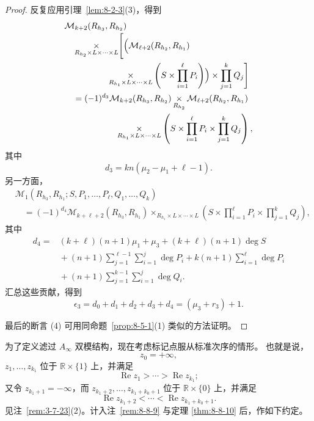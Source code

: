 \begin{proof}
反复应用引理~\ref{lem:8-2-3}(3)，得到
\[
\begin{aligned}
 &\mathcal M_{k+2}(R_{h_3},R_{h_2})\\[-2pt]
 &\quad
 \mathop{\times}_{R_{h_2}\times L\times\cdots\times L}
 \Biggl[
 \Bigl(
 \mathcal M_{\ell+2}(R_{h_2},R_{h_1})\\
 &\hspace{5em}{}
 \mathop{\times}_{R_{h_1}\times L\times\cdots\times L}
 \left(S\times\prod_{i=1}^{\ell}P_i\right)
 \Bigr)
 \times\prod_{j=1}^{k}Q_j
 \Biggr]\\
 &\quad=
 (-1)^{d_3}
 \mathcal M_{k+2}(R_{h_3},R_{h_2})
 \mathop{\times}_{R_{h_2}}
 \mathcal M_{\ell+2}(R_{h_2},R_{h_1})\\
 &\hspace{6em}{}
 \mathop{\times}_{R_{h_1}\times L\times\cdots\times L}
 \left(
 S\times\prod_{i=1}^{\ell}P_i
 \times\prod_{j=1}^{k}Q_j
 \right),
\end{aligned}
\]
其中
\[
 d_3=kn(\mu_2-\mu_1+\ell-1).
\]
另一方面，
\[
\begin{aligned}
 &\mathcal M_1
 (R_{h_3},R_{h_1};
 S,P_1,\ldots,P_\ell,Q_1,\ldots,Q_k)\\
 &\quad=
 (-1)^{d_4}
 \mathcal M_{k+\ell+2}(R_{h_3},R_{h_1})
 \mathop{\times}_{R_{h_1}\times L\times\cdots\times L}
 \left(
 S\times\prod_{i=1}^{\ell}P_i
 \times\prod_{j=1}^{k}Q_j
 \right),
\end{aligned}
\]
其中
\[
\begin{aligned}
 d_4={}&
 (k+\ell)(n+1)\mu_1+\mu_3
 +(k+\ell)(n+1)\deg S\\
 &{}+(n+1)
 \sum_{j=1}^{\ell-1}\sum_{i=1}^{j}\deg P_i
 +k(n+1)\sum_{i=1}^{\ell}\deg P_i\\
 &{}+(n+1)
 \sum_{j=1}^{k-1}\sum_{i=1}^{j}\deg Q_i.
\end{aligned}
\]
汇总这些贡献，得到
\[
 \epsilon_3=d_0+d_1+d_2+d_3+d_4
 =(\mu_3+r_3)+1.
\]

最后的断言 (4) 可用同命题~\ref{prop:8-5-1}(1) 类似的方法证明。
\end{proof}

为了定义滤过 $A_\infty$ 双模结构，现在考虑标记点服从标准次序的情形。
也就是说，
\[
 z_0=+\infty,
\]
$z_1,\ldots,z_{k_1}$ 位于 $\mathbb R\times\{1\}$ 上，并满足
\[
 \operatorname{Re}z_1>\cdots>\operatorname{Re}z_{k_1};
\]
又令 $z_{k_1+1}=-\infty$，而
$z_{k_1+2},\ldots,z_{k_1+k_0+1}$ 位于
$\mathbb R\times\{0\}$ 上，并满足
\[
 \operatorname{Re}z_{k_1+2}<\cdots<
 \operatorname{Re}z_{k_1+k_0+1}.
\]
见注~\ref{rem:3-7-23}(2)。计入注~\ref{rem:8-8-9} 与定理
\ref{thm:8-8-10} 后，作如下约定。

